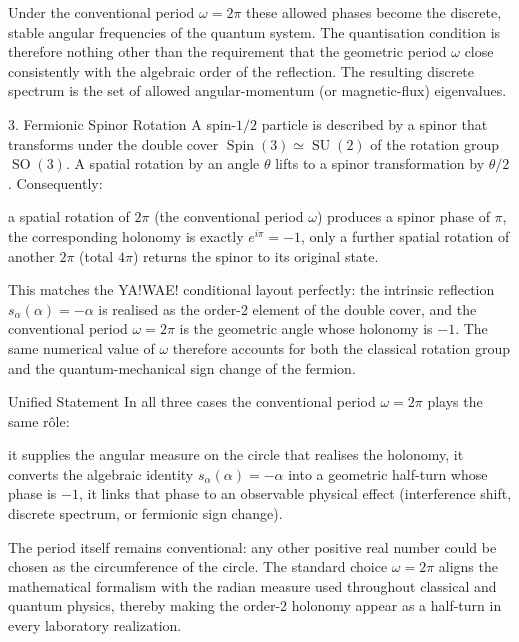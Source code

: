 Under the conventional period \(\omega=2\pi\) these allowed phases become the discrete, stable angular frequencies of the quantum system. The quantisation condition is therefore nothing other than the requirement that the geometric period \(\omega\) close consistently with the algebraic order of the reflection. The resulting discrete spectrum is the set of allowed angular-momentum (or magnetic-flux) eigenvalues.

3. Fermionic Spinor Rotation
A spin-\(1/2\) particle is described by a spinor that transforms under the double cover \(\operatorname{Spin}(3)\simeq\operatorname{SU}(2)\) of the rotation group \(\operatorname{SO}(3)\). A spatial rotation by an angle \(\theta\) lifts to a spinor transformation by \(\theta/2\). Consequently:

a spatial rotation of \(2\pi\) (the conventional period \(\omega\)) produces a spinor phase of \(\pi\),  
the corresponding holonomy is exactly \(e^{i\pi}=-1\),  
only a further spatial rotation of another \(2\pi\) (total \(4\pi\)) returns the spinor to its original state.

This matches the YA!WAE! conditional layout perfectly: the intrinsic reflection \(s_\alpha(\alpha)=-\alpha\) is realised as the order-2 element of the double cover, and the conventional period \(\omega=2\pi\) is the geometric angle whose holonomy is \(-1\). The same numerical value of \(\omega\) therefore accounts for both the classical rotation group and the quantum-mechanical sign change of the fermion.

Unified Statement
In all three cases the conventional period \(\omega=2\pi\) plays the same rôle:

it supplies the angular measure on the circle that realises the holonomy,  
it converts the algebraic identity \(s_\alpha(\alpha)=-\alpha\) into a geometric half-turn whose phase is \(-1\),  
it links that phase to an observable physical effect (interference shift, discrete spectrum, or fermionic sign change).

The period itself remains conventional: any other positive real number could be chosen as the circumference of the circle. The standard choice \(\omega=2\pi\) aligns the mathematical formalism with the radian measure used throughout classical and quantum physics, thereby making the order-2 holonomy appear as a half-turn in every laboratory realization.
